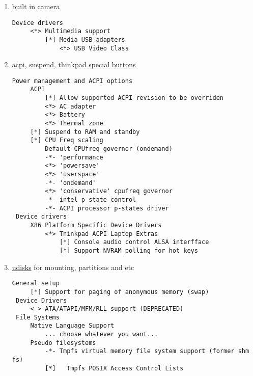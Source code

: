 \documentclass[11pt,a4paper]{article}
\begin{document}
\begin{enumerate}
                    \newpage
                    \item built in camera
                        \begin{lstlisting}[style=KernelConfig]
 Device drivers
     <*> Multimedia support
         [*] Media USB adapters
             <*> USB Video Class
                        \end{lstlisting}

                    \newpage
                    \item \href{https://wiki.gentoo.org/wiki/ACPI#Kernel}{acpi}, \href{https://wiki.gentoo.org/wiki/Suspend_and_hibernate}{suspend}, \href{https://wiki.gentoo.org/wiki/ACPI/ThinkPad-special-buttons#Preparation}{thinkpad special buttons}

                        \begin{lstlisting}[style=KernelConfig]
 Power management and ACPI options
     ACPI
         [*] Allow supported ACPI revision to be overriden
         <*> AC adapter
         <*> Battery
         <*> Thermal zone
     [*] Suspend to RAM and standby
     [*] CPU Freq scaling
         Default CPUfreq governor (ondemand)
         -*- 'performance
         <*> 'powersave'
         <*> 'userspace'
         -*- 'ondemand'
         <*> 'conservative' cpufreq governor
         -*- intel p state control
         -*- ACPI processor p-states driver
 Device drivers
     X86 Platform Specific Device Drivers
         <*> Thinkpad ACPI Laptop Extras
             [*] Console audio control ALSA interfface
             [*] Support NVRAM polling for hot keys
                        \end{lstlisting}

                    \newpage
                    \item \href{https://wiki.gentoo.org/wiki/Udisks#Kernel}{udisks} for mounting, partitions and etc

                        \begin{lstlisting}[style=KernelConfig]
 General setup
     [*] Support for paging of anonymous memory (swap)
 Device Drivers
     < > ATA/ATAPI/MFM/RLL support (DEPRECATED)
 File Systems
     Native Language Support
         ... choose whatever you want...
     Pseudo filesystems
         -*- Tmpfs virtual memory file system support (former shm fs)
         [*]   Tmpfs POSIX Access Control Lists

                        \end{lstlisting}

                \end{enumerate}
\end{document}
